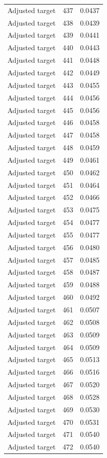 \begin{table}[htbp]
\begin{tabular}{lll}
Adjusted target & 437 & 0.0437 \\
Adjusted target & 438 & 0.0439 \\
Adjusted target & 439 & 0.0441 \\
Adjusted target & 440 & 0.0443 \\
Adjusted target & 441 & 0.0448 \\
Adjusted target & 442 & 0.0449 \\
Adjusted target & 443 & 0.0455 \\
Adjusted target & 444 & 0.0456 \\
Adjusted target & 445 & 0.0456 \\
Adjusted target & 446 & 0.0458 \\
Adjusted target & 447 & 0.0458 \\
Adjusted target & 448 & 0.0459 \\
Adjusted target & 449 & 0.0461 \\
Adjusted target & 450 & 0.0462 \\
Adjusted target & 451 & 0.0464 \\
Adjusted target & 452 & 0.0466 \\
Adjusted target & 453 & 0.0475 \\
Adjusted target & 454 & 0.0477 \\
Adjusted target & 455 & 0.0477 \\
Adjusted target & 456 & 0.0480 \\
Adjusted target & 457 & 0.0485 \\
Adjusted target & 458 & 0.0487 \\
Adjusted target & 459 & 0.0488 \\
Adjusted target & 460 & 0.0492 \\
Adjusted target & 461 & 0.0507 \\
Adjusted target & 462 & 0.0508 \\
Adjusted target & 463 & 0.0509 \\
Adjusted target & 464 & 0.0509 \\
Adjusted target & 465 & 0.0513 \\
Adjusted target & 466 & 0.0516 \\
Adjusted target & 467 & 0.0520 \\
Adjusted target & 468 & 0.0528 \\
Adjusted target & 469 & 0.0530 \\
Adjusted target & 470 & 0.0531 \\
Adjusted target & 471 & 0.0540 \\
Adjusted target & 472 & 0.0540 \\

\end{tabular}
\end{table}
